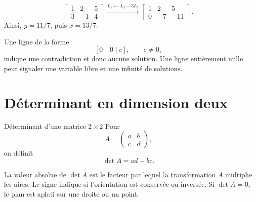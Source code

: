 \documentclass[12pt,a4paper,openany]{book}
\newcommand{\abs}[1]{\left\lvert #1\right\rvert}
\begin{document}
\begin{examplebox}
\[
\left[
\begin{array}{cc|c}
1&2&5\\
3&-1&4
\end{array}
\right]
\xrightarrow{L_2\leftarrow L_2-3L_1}
\left[
\begin{array}{cc|c}
1&2&5\\
0&-7&-11
\end{array}
\right].
\]
Ainsi, $y=11/7$, puis $x=13/7$.
\end{examplebox}

Une ligne de la forme
\[
[0\quad0\mid c],\qquad c\neq0,
\]
indique une contradiction et donc aucune solution. Une ligne entièrement nulle peut signaler une variable libre et une infinité de solutions.

\section{Déterminant en dimension deux}

\begin{definition}{Déterminant d'une matrice $2\times2$}{}
Pour
\[
A=\begin{pmatrix}a&b\\c&d\end{pmatrix},
\]
on définit
\[
\det A=ad-bc.
\]
\end{definition}

\begin{intuitionbox}
La valeur absolue de $\det A$ est le facteur par lequel la transformation $A$ multiplie les aires. Le signe indique si l'orientation est conservée ou inversée. Si $\det A=0$, le plan est aplati sur une droite ou un point.
\end{intuitionbox}

\begin{center}
\end{center}
\end{document}
